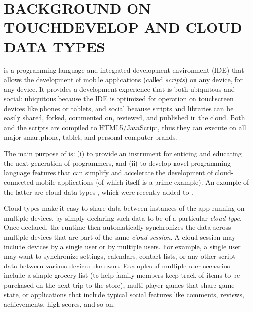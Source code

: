 \documentclass[article]{sigplanconf}
\begin{document}
\section{BACKGROUND ON TOUCHDEVELOP AND CLOUD DATA TYPES}
\TD is a programming language and integrated development environment (IDE) that
allows the development of mobile applications (called \emph{scripts}) on any
device, for any device. 
It provides a development experience that is both ubiquitous and social:
ubiquitous because the IDE is optimized for operation on touchscreen devices
like phones or tablets, and social because scripts and libraries can be easily
shared, forked, commented on, reviewed, and published in the cloud.
Both \TD and the \TD scripts are compiled to HTML5/JavaScript, thus they can
execute on all major smartphone, tablet, and personal computer brands.  

The main purpose of \TD is: (i) to provide an instrument for enticing and educating the next generation of programmers, and (ii) to develop novel programming language features that can simplify and accelerate the development of cloud-connected mobile applications (of which \TD itself is a prime example). An example of the latter are cloud data types \cite{burckhardt2012cloud}, which were recently added to \TD. 

Cloud types make it easy to share data between instances of the app running on multiple devices, by simply declaring such data to be of a particular \emph{cloud type}. Once declared, the runtime then automatically synchronizes the data across multiple devices that are part of the same \emph{cloud session}. A cloud session may include devices by a single user or by multiple users.  For example, a single user may want to synchronize settings, calendars, contact lists, or any other script data between various devices she owns. Examples of multiple-user scenarios include a simple grocery list (to help family members keep track of items to be purchased on the next trip to the store), multi-player games that share game state, or applications that include typical social features like comments, reviews, achievements, high scores, and so on.
\end{document}

